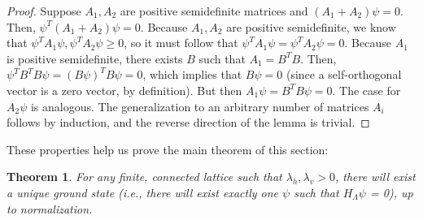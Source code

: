 \documentclass{article}
\newtheorem{theorem}{Theorem}
\newcommand{\hl}{H_\Lambda}
\numberwithin{equation}{section}
\numberwithin{theorem}{section}
\numberwithin{proposition}{section}
\numberwithin{lemma}{section}
\numberwithin{corollary}{section}
\numberwithin{definition}{section}
\begin{document}
\begin{proof}
	Suppose $A_1, A_2$ are positive semidefinite matrices and $(A_1 + A_2)\psi = 0$. Then, $\psi^T{}(A_1 + A_2) \psi = 0$. Because $A_1, A_2$ are positive semidefinite, we know that $\psi^T{} A_1 \psi, \psi^T{} A_2 \psi \geq 0$, so it must follow that $\psi^T{} A_1 \psi = \psi^T{} A_2 \psi = 0$. Because $A_1$ is positive semidefinite, there exists $B$ such that $A_1 = B^T{} B$. Then, $\psi^T{} B^T{} B \psi = (B \psi)^T{} B \psi = 0$, which implies that $B \psi = 0$ (since a self-orthogonal vector is a zero vector, by definition). But then $A_1\psi = B^T{} B\psi = 0$. The case for $A_2 \psi$ is analogous. The generalization to an arbitrary number of matrices $A_i$ follows by induction, and the reverse direction of the lemma is trivial.
\end{proof}

These properties help us prove the main theorem of this section:

\begin{theorem}
	For any finite, connected lattice such that $\lambda_h, \lambda_v > 0$, there will exist a unique ground state (i.e., there will exist exactly one $\psi$ such that $\hl \psi$ = 0), up to normalization.
\end{theorem}
\end{document}
